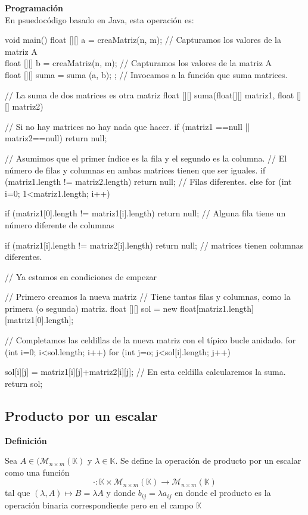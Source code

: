 \documentclass[10pt]{article}
\begin{document}
\noindent\textbf{Programación} \\

En psuedocódigo basado en Java, esta operación es:
\begin{code}[caption=Suma de Matrices, label=default]
void main() {
  float [][] a = creaMatriz(n, m); // Capturamos los valores de la matriz A \\
  float [][] b = creaMatriz(n, m); // Capturamos los valores de la matriz A \\
  float [][] suma = suma (a, b); ; // Invocamos a la función que suma matrices. \\
} 

// La suma de dos matrices es otra matriz
float [][] suma(float[][] matriz1, float [][] matriz2) {
   // Si no hay matrices no hay nada que hacer.
   if (matriz1 ==null || matriz2==null) return null;
   
   // Asumimos que el primer índice es la fila y el segundo es la columna.
   // El número de filas y columnas en ambas matrices tienen que ser iguales.
   if (matriz1.length != matriz2.length) return null; // Filas diferentes.
   else
     for (int i=0; 1<matriz1.length; i++) {
       if (matriz1[0].length != matriz1[i].length) 
         return null; // Alguna fila tiene un número diferente de columnas
         
       if (matriz1[i].length != matriz2[i].length)
         return null; //  matrices tienen columnas diferentes.
     }
   // Ya estamos en condiciones de empezar
   
   // Primero creamos la nueva matriz
   // Tiene tantas filas y columnas, como la primera (o segunda) matriz.
   float [][] sol = new float[matriz1.length][matriz1[0].length];
   
   // Completamos las celdillas de la nueva matriz con el típico bucle anidado.
   for (int i=0; i<sol.length; i++)
     for (int j=o; j<sol[i].length; j++)
     
       sol[i][j] = matriz1[i][j]+matriz2[i][j]; // En esta celdilla calcularemos la suma.
   return sol;
}    
\end{code}

\subsection{Producto por un escalar}

\noindent\textbf{Definición}

Sea $A \in (\mathcal{M}_{n\times {m}}(\mathbb{K})$ y $\lambda \in \mathbb{K}$. Se define la operación de producto por un escalar como una función  
$$
\cdot : \mathbb{K} \times \mathcal{M}_{n\times {m}}(\mathbb{K}) \longrightarrow \mathcal{M}_{n\times {m}}(\mathbb{K})
$$
tal que $(\lambda, A) \mapsto B = \lambda A$ y donde $b_{ij} = \lambda a_{ij}$ en donde el producto es la operación binaria correspondiente pero en el campo $\mathbb{K}$ \\
\end{document}
